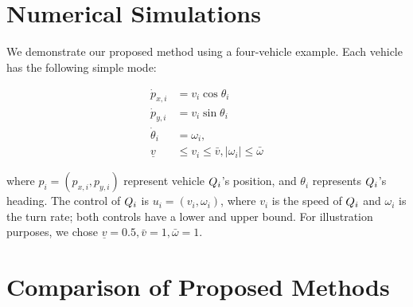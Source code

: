 \section{Numerical Simulations \label{sec:sim}}
We demonstrate our proposed method using a four-vehicle example. Each vehicle has the following simple mode:

\begin{equation}
\label{eq:dyn_i}
\begin{aligned}
\dot{p}_{x,i} &= v_i \cos \theta_i \\
\dot{p}_{y,i} &= v_i \sin \theta_i \\
\dot{\theta}_i &= \omega_i, \\
\underline{v} &\le v_i \le \bar{v}, |\omega_i| \le \bar{\omega}
\end{aligned}
\end{equation}

\noindent where $p_i = (p_{x,i}, p_{y,i})$ represent vehicle $Q_i$'s position, and $\theta_i$ represents $Q_i$'s heading. The control of $Q_i$ is $u_i = (v_i, \omega_i)$, where $v_i$ is the speed of $Q_i$ and $\omega_i$ is the turn rate; both controls have a lower and upper bound. For illustration purposes, we chose $\underline{v} = 0.5, \bar{v} = 1, \bar\omega = 1$.



\section{Comparison of Proposed Methods}